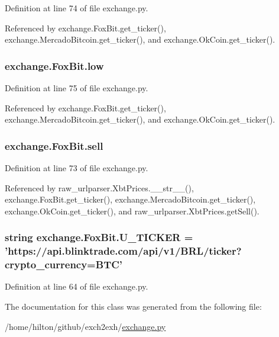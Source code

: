 Definition at line 74 of file exchange.\-py.



Referenced by exchange.\-Fox\-Bit.\-get\-\_\-ticker(), exchange.\-Mercado\-Bitcoin.\-get\-\_\-ticker(), and exchange.\-Ok\-Coin.\-get\-\_\-ticker().

\hypertarget{classexchange_1_1_fox_bit_acd666444cff98fe477651120ddb0f915}{
\subsubsection[{low}]{\setlength{\rightskip}{0pt plus 5cm}exchange.\-Fox\-Bit.\-low}}\label{classexchange_1_1_fox_bit_acd666444cff98fe477651120ddb0f915}


Definition at line 75 of file exchange.\-py.



Referenced by exchange.\-Fox\-Bit.\-get\-\_\-ticker(), exchange.\-Mercado\-Bitcoin.\-get\-\_\-ticker(), and exchange.\-Ok\-Coin.\-get\-\_\-ticker().

\hypertarget{classexchange_1_1_fox_bit_ac1fae4ef7a43254b71d7173a5cc6eeaf}{
\subsubsection[{sell}]{\setlength{\rightskip}{0pt plus 5cm}exchange.\-Fox\-Bit.\-sell}}\label{classexchange_1_1_fox_bit_ac1fae4ef7a43254b71d7173a5cc6eeaf}


Definition at line 73 of file exchange.\-py.



Referenced by raw\-\_\-urlparser.\-Xbt\-Prices.\-\_\-\-\_\-str\-\_\-\-\_\-(), exchange.\-Fox\-Bit.\-get\-\_\-ticker(), exchange.\-Mercado\-Bitcoin.\-get\-\_\-ticker(), exchange.\-Ok\-Coin.\-get\-\_\-ticker(), and raw\-\_\-urlparser.\-Xbt\-Prices.\-get\-Sell().

\hypertarget{classexchange_1_1_fox_bit_a7ba3f64a2b55479da2239393c6140ec8}{
\subsubsection[{U\-\_\-\-T\-I\-C\-K\-E\-R}]{\setlength{\rightskip}{0pt plus 5cm}string exchange.\-Fox\-Bit.\-U\-\_\-\-T\-I\-C\-K\-E\-R = 'https\-://api.\-blinktrade.\-com/api/v1/B\-R\-L/ticker?crypto\-\_\-currency=B\-T\-C'\hspace{0.3cm}{\ttfamily [static]}}}\label{classexchange_1_1_fox_bit_a7ba3f64a2b55479da2239393c6140ec8}


Definition at line 64 of file exchange.\-py.



The documentation for this class was generated from the following file\-:\begin{DoxyCompactItemize}
\item 
/home/hilton/github/exch2exh/\hyperlink{exchange_8py}{exchange.\-py}\end{DoxyCompactItemize}

